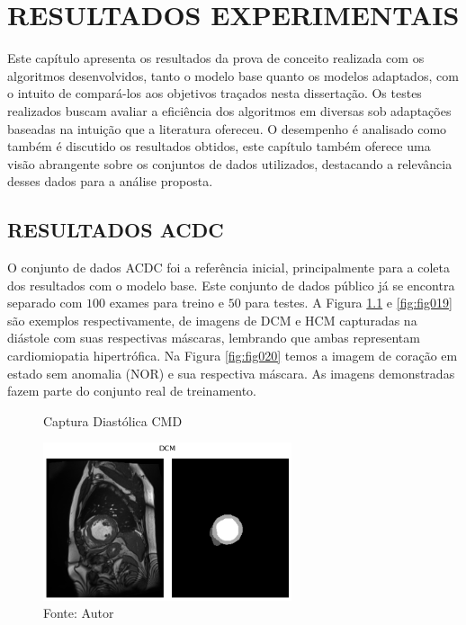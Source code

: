 \chapter{RESULTADOS EXPERIMENTAIS}
\label{chap:resultados_experimentais}

Este capítulo apresenta os resultados da prova de conceito realizada com os algoritmos desenvolvidos, tanto o modelo base quanto os modelos adaptados, com o intuito de compará-los aos objetivos traçados nesta dissertação. Os testes realizados buscam avaliar a eficiência dos algoritmos em diversas sob adaptações baseadas na intuição que a literatura ofereceu. O desempenho é analisado como também é discutido os resultados obtidos, este capítulo também oferece uma visão abrangente sobre os conjuntos de dados utilizados, destacando a relevância desses dados para a análise proposta.

\section{RESULTADOS ACDC}
\label{sec:resultados_acdc}

O conjunto de dados \gls{ACDC} foi a referência inicial, principalmente para a coleta dos resultados com o modelo base. Este conjunto de dados público já se encontra separado com $100$ exames para treino e $50$ para testes. A Figura \ref{fig:fig018} e \ref{fig:fig019} são exemplos respectivamente, de imagens de \gls{DCM} e \gls{HCM} capturadas na diástole com suas respectivas máscaras, lembrando que ambas representam cardiomiopatia hipertrófica. Na Figura \ref{fig:fig020} temos a imagem de coração em estado sem anomalia (\gls{NOR}) e sua respectiva máscara. As imagens demonstradas fazem parte do conjunto real de treinamento.

\begin{figure}[h!]
    \centering
    \caption{Captura Diastólica CMD}
    \includegraphics[width=0.65\textwidth]{figures/fig018.png}
    \caption*{Fonte: Autor}
    \label{fig:fig018}
\end{figure}

